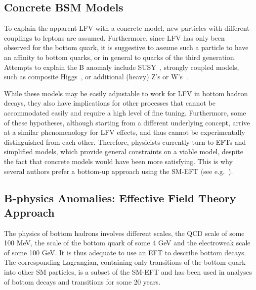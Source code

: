 \subsection{Concrete BSM Models}
\label{sec:B-con-BSM}

To explain the apparent LFV with a concrete model, new particles with
different couplings to leptons are assumed.  Furthermore, since LFV
has only been observed for the bottom quark, it is suggestive to
assume such a particle to have an affinity to bottom quarks, or in
general to quarks of the third generation.  Attempts to explain the B
anomaly include SUSY~\citep{Altmannshofer:2017poe}, strongly
coupled models, such as composite Higgs~\citep{Greljo:2015mma}, or
additional (heavy) Z's or W's~\citep{Boucenna:2016qad}.

While these models may be easily adjustable to work for LFV in 
bottom hadron decays, they also have implications for other processes
that cannot be accommodated easily and require a high level of fine
tuning. Furthermore, some of these hypotheses, although starting from
a different underlying concept, arrive at a similar phenomenology for 
LFV effects, and thus cannot be experimentally distinguished from each other. Therefore, physicists currently turn to EFTs and simplified models, which
provide general constraints on a viable model, %
despite the fact that concrete models would have been more satisfying.
This is why several authors prefer a bottom-up approach using the
SM-EFT (see e.g.~\citet{Buttazzo:2017ixm}).

\subsection{B-physics Anomalies: Effective Field Theory Approach}\label{sec:Bphysics}

The physics of bottom hadrons involves different scales, the QCD scale of
some 100 MeV, the scale of the bottom quark of some 4 GeV and the
electroweak scale of some 100 GeV. It is thus adequate to use an EFT to
describe bottom decays.  The corresponding Lagrangian, containing only
transitions of the bottom quark into other SM particles, is a subset
of the SM-EFT and has been used in analyses of bottom decays and
transitions for some 20 years.

